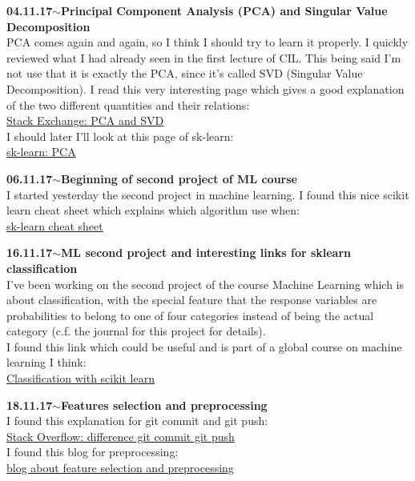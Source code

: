 \documentclass[11pt,a4paper]{article}
\newenvironment{loggentry}[2]%
{\noindent\textbf{#1}\hspace{1cm}$\mathbf{\sim}$\text{ }\textbf{#2}\\}{\vspace{0.5cm}}
\begin{document}
\begin{loggentry}{04.11.17}{Principal Component Analysis (PCA) and Singular Value Decomposition}
PCA comes again and again, so I think I should try to learn it properly. I quickly reviewed what I had already seen in the first lecture of CIL. This being said I'm not use that it is exactly the PCA, since it's called SVD (Singular Value Decomposition). I read this very interesting page which gives a good explanation of the two different quantities and their relations:\\
\href{https://stats.stackexchange.com/questions/134282/relationship-between-svd-and-pca-how-to-use-svd-to-perform-pca#134283}{Stack Exchange: PCA and SVD}\\
I should later I'll look at this page of sk-learn:\\
\href{http://scikit-learn.org/stable/modules/decomposition.html#pca}{sk-learn: PCA}
\end{loggentry}

\begin{loggentry}{06.11.17}{Beginning of second project of ML course}
I started yesterday the second project in machine learning. I found this nice scikit learn cheat sheet which explains which algorithm use when:\\
\href{http://scikit-learn.org/stable/tutorial/machine_learning_map/index.html}{sk-learn cheat sheet}
\end{loggentry}

\begin{loggentry}{16.11.17}{ML second project and interesting links for sklearn classification}
I've been working on the second project of the course Machine Learning which is about classification, with the special feature that the response variables are probabilities to belong to one of four categories instead of being the actual category (c.f. the journal for this project for details).\\
I found this link which could be useful and is part of a global course on machine learning I think:\\
\href{https://www.datarobot.com/blog/classification-with-scikit-learn/}{Classification with scikit learn}
\end{loggentry}

\begin{loggentry}{18.11.17}{Features selection and preprocessing}
I found this explanation for git commit and git push:\\
\href{https://stackoverflow.com/questions/2745076/what-are-the-differences-between-git-commit-and-git-push}{Stack Overflow: difference git commit git push}\\
I found this blog for preprocessing:\\
\href{http://blog.datadive.net/selecting-good-features-part-i-univariate-selection/}{blog about feature selection and preprocessing}
\end{loggentry}
\end{document}
